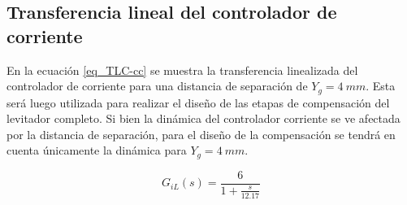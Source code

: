 \subsection{Transferencia lineal del controlador de corriente}

\noindent En la ecuación \ref{eq_TLC-cc} se muestra la transferencia linealizada del controlador de corriente para una distancia de separación de $Y_g=4\:mm$. Esta será luego utilizada para realizar el diseño de las etapas de compensación del levitador completo. Si bien la dinámica del controlador corriente se ve afectada por la distancia de separación, para el diseño de la compensación se tendrá en cuenta únicamente la dinámica para $Y_g=4\:mm$.

\begin{equation} \label{eq_TLC-cc}
G_{iL}(s) = \frac{6}{1+\frac{s}{12.17}}
\end{equation}
